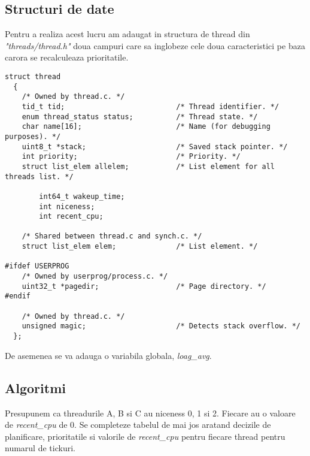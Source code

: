 \documentclass[a4paper,12pt]{report}
\begin{document}
\subsection{Structuri de date}
Pentru a realiza acest lucru am adaugat in structura de thread din \textit{"threads/thread.h"} doua campuri care
sa inglobeze cele doua caracteristici pe baza carora se recalculeaza prioritatile. 

\begin{lstlisting}
struct thread
  {
    /* Owned by thread.c. */
    tid_t tid;                          /* Thread identifier. */
    enum thread_status status;          /* Thread state. */
    char name[16];                      /* Name (for debugging purposes). */
    uint8_t *stack;                     /* Saved stack pointer. */
    int priority;                       /* Priority. */
    struct list_elem allelem;           /* List element for all threads list. */

		int64_t wakeup_time;
		int niceness;
		int recent_cpu;

    /* Shared between thread.c and synch.c. */
    struct list_elem elem;              /* List element. */

#ifdef USERPROG
    /* Owned by userprog/process.c. */
    uint32_t *pagedir;                  /* Page directory. */
#endif

    /* Owned by thread.c. */
    unsigned magic;                     /* Detects stack overflow. */
  };

\end{lstlisting}

De asemenea se va adauga o variabila globala, \textit{loag\_avg}.

\subsection{Algoritmi}
Presupunem ca threadurile A, B si C au niceness 0, 1 si 2. Fiecare au o valoare de \textit{recent\_cpu} de 0. Se 
completeze tabelul de mai jos aratand decizile de planificare, prioritatile si valorile de 
\textit{recent\_cpu} pentru fiecare thread pentru numarul de tickuri.
\end{document}
